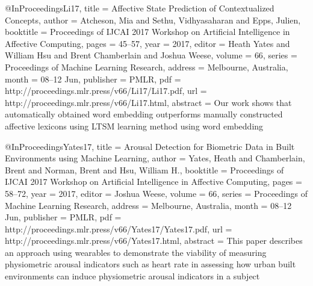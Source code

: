 @InProceedings{Li17,
  title = {Affective State Prediction of Contextualized Concepts},
  author = {Atcheson, Mia and Sethu, Vidhyasaharan and Epps, Julien},
  booktitle = {Proceedings of IJCAI 2017 Workshop on Artificial Intelligence in Affective Computing},
  pages = 	 {45--57},
  year = 	 {2017},
  editor =    {Heath Yates and William Hsu and Brent Chamberlain and Joshua Weese},
  volume = 	 {66},
  series = 	 {Proceedings of Machine Learning Research},
  address =  {Melbourne, Australia},
  month = 	 {08--12 Jun},
  publisher = {PMLR},
  pdf = 	 {http://proceedings.mlr.press/v66/Li17/Li17.pdf},
  url = 	 {http://proceedings.mlr.press/v66/Li17.html},
  abstract = {Our work shows that automatically obtained word embedding outperforms manually constructed affective lexicons using LTSM learning method using word embedding}
}

@InProceedings{Yates17,
  title = {Arousal Detection for Biometric Data in Built Environments using Machine Learning},
  author = {Yates, Heath and Chamberlain, Brent and Norman, Brent and Hsu, William H.},
  booktitle = {Proceedings of IJCAI 2017 Workshop on Artificial Intelligence in Affective Computing},
  pages = 	 {58--72},
  year = 	 {2017},
  editor =    {Joshua Weese},
  volume = 	 {66},
  series = 	 {Proceedings of Machine Learning Research},
  address =  {Melbourne, Australia},
  month = 	 {08--12 Jun},
  publisher = {PMLR},
  pdf = 	 {http://proceedings.mlr.press/v66/Yates17/Yates17.pdf},
  url = 	 {http://proceedings.mlr.press/v66/Yates17.html},
  abstract = {This paper describes an approach using wearables to demonstrate the viability of measuring physiometric arousal indicators such as heart rate in assessing how urban built environments can induce physiometric arousal indicators in a subject}
}



